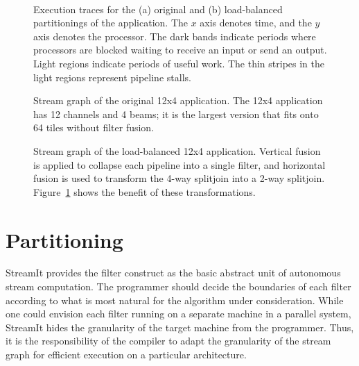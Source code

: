 \begin{figure}
   \\
  \hspace{0.3in}  \vspace{-6pt} \caption{Execution traces for the (a)
    original and (b) load-balanced partitionings of the \Radar application.
    The $x$ axis denotes time, and the $y$ axis denotes the processor.
    The dark bands indicate periods where processors are blocked
    waiting to receive an input or send an output.  Light regions
    indicate periods of useful work.  The thin stripes in the light
    regions represent pipeline stalls. \protect\label{fig:beam-blood}}
\end{figure}

\begin{figure}
\caption{\protect\small Stream graph of the original 12x4 \Radar
application.  The 12x4 \Radar application has 12 channels and 4 beams;
it is the largest version that fits onto 64 tiles without filter
fusion.  \protect\label{fig:beam-orig}}
\vspace{36pt}
\caption{\protect\small Stream graph of the load-balanced 12x4
\Radar application.  Vertical fusion is applied to collapse each pipeline
into a single filter, and horizontal fusion is used to transform the
4-way splitjoin into a 2-way splitjoin.  Figure~\ref{fig:beam-blood}
shows the benefit of these
transformations. \protect\label{fig:beam-opt}}
\end{figure}

\section{Partitioning}
\label{sec:partition}

StreamIt provides the filter construct as the basic abstract unit of
autonomous stream computation.  The programmer should decide the
boundaries of each filter according to what is most natural for the
algorithm under consideration.  While one could envision each filter
running on a separate machine in a parallel system, StreamIt hides the
granularity of the target machine from the programmer.  Thus, it is
the responsibility of the compiler to adapt the granularity of the
stream graph for efficient execution on a particular architecture.

